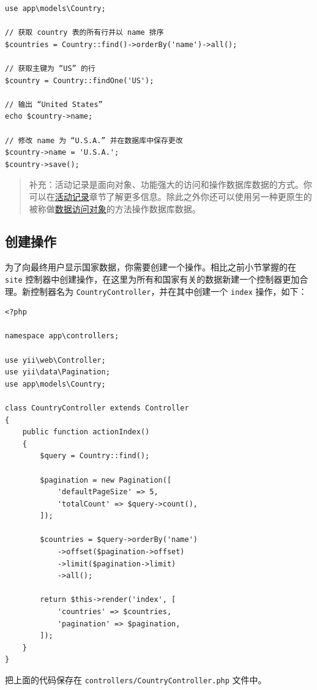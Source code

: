 \lstset{language=php}\begin{lstlisting}
use app\models\Country;

// 获取 country 表的所有行并以 name 排序
$countries = Country::find()->orderBy('name')->all();

// 获取主键为 “US” 的行
$country = Country::findOne('US');

// 输出 “United States”
echo $country->name;

// 修改 name 为 “U.S.A.” 并在数据库中保存更改
$country->name = 'U.S.A.';
$country->save();
\end{lstlisting}
\begin{quote}补充：活动记录是面向对象、功能强大的访问和操作数据库数据的方式。你可以在\hyperref[db-active-record.md]{活动记录}章节了解更多信息。除此之外你还可以使用另一种更原生的被称做\hyperref[db-dao]{数据访问对象}的方法操作数据库数据。

\end{quote}
\subsection{创建操作 \label{start-databases.md::creating-action}}
为了向最终用户显示国家数据，你需要创建一个操作。相比之前小节掌握的在 \lstinline|site| 控制器中创建操作，在这里为所有和国家有关的数据新建一个控制器更加合理。新控制器名为 \lstinline|CountryController|，并在其中创建一个 \lstinline|index| 操作，如下：

\lstset{language=php}\begin{lstlisting}
<?php

namespace app\controllers;

use yii\web\Controller;
use yii\data\Pagination;
use app\models\Country;

class CountryController extends Controller
{
    public function actionIndex()
    {
        $query = Country::find();

        $pagination = new Pagination([
            'defaultPageSize' => 5,
            'totalCount' => $query->count(),
        ]);

        $countries = $query->orderBy('name')
            ->offset($pagination->offset)
            ->limit($pagination->limit)
            ->all();

        return $this->render('index', [
            'countries' => $countries,
            'pagination' => $pagination,
        ]);
    }
}
\end{lstlisting}
把上面的代码保存在 \lstinline|controllers/CountryController.php| 文件中。

